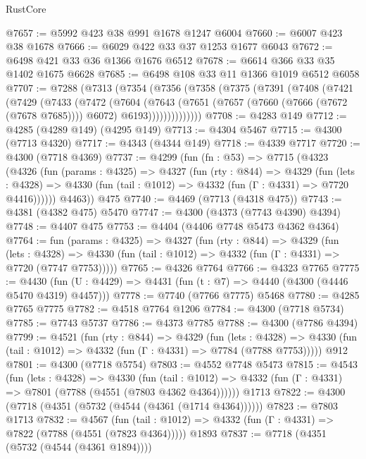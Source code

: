 \begin{lexlean}{RustCore}
\begin{coremodule}
@7657 := @5992 @423 @38 @991 @1678 @1247 @6004
@7660 := @6007 @423 @38 @1678
@7666 := @6029 @422 @33 @37 @1253 @1677 @6043
@7672 := @6498 @421 @33 @36 @1366 @1676 @6512
@7678 := @6614 @366 @33 @35 @1402 @1675 @6628
@7685 := @6498 @108 @33 @11 @1366 @1019 @6512 @6058
@7707 := @7288
    (@7313
      (@7354
        (@7356
          (@7358
            (@7375
              (@7391
                (@7408
                  (@7421
                    (@7429
                      (@7433
                        (@7472
                          (@7604
                            (@7643
                              (@7651
                                (@7657 (@7660 (@7666 (@7672 (@7678 @7685)))) @6072)
                                @6193))))))))))))))
@7708 := @4283 @149
@7712 := @4285 (@4289 @149) (@4295 @149)
@7713 := @4304 @5467
@7715 := @4300 (@7713 @4320)
@7717 := @4343 (@4344 @149)
@7718 := @4339 @7717
@7720 := @4300 (@7718 @4369)
@7737 := @4299
    (fun (fn : @53) =>
    @7715
      (@4323
        (@4326
          (fun (params : @4325) =>
          @4327
            (fun (rty : @844) =>
            @4329
              (fun (lets : @4328) =>
              @4330 (fun (tail : @1012) => @4332 (fun (Γ : @4331) => @7720 @4416))))))
        @4463))
    @475
@7740 := @4469 (@7713 (@4318 @475))
@7743 := @4381 (@4382 @475) @5470
@7747 := @4300 (@4373 (@7743 @4390) @4394)
@7748 := @4407 @475
@7753 := @4404 (@4406 @7748 @5473 @4362 @4364)
@7764 := fun (params : @4325) =>
  @4327
    (fun (rty : @844) =>
    @4329
      (fun (lets : @4328) =>
      @4330 (fun (tail : @1012) => @4332 (fun (Γ : @4331) => @7720 (@7747 @7753)))))
@7765 := @4326 @7764
@7766 := @4323 @7765
@7775 := @4430 (fun (U : @4429) => @4431 (fun (t : @7) => @4440 (@4300 (@4446 @5470 @4319) @4457)))
@7778 := @7740 (@7766 @7775) @5468
@7780 := @4285 @7765 @7775
@7782 := @4518 @7764 @1206
@7784 := @4300 (@7718 @5734)
@7785 := @7743 @5737
@7786 := @4373 @7785
@7788 := @4300 (@7786 @4394)
@7799 := @4521
    (fun (rty : @844) =>
    @4329
      (fun (lets : @4328) =>
      @4330 (fun (tail : @1012) => @4332 (fun (Γ : @4331) => @7784 (@7788 @7753)))))
    @912
@7801 := @4300 (@7718 @5754)
@7803 := @4552 @7748 @5473
@7815 := @4543
    (fun (lets : @4328) =>
    @4330
      (fun (tail : @1012) => @4332 (fun (Γ : @4331) => @7801 (@7788 (@4551 (@7803 @4362 @4364))))))
    @1713
@7822 := @4300 (@7718 (@4351 (@5732 (@4544 (@4361 (@1714 @4364))))))
@7823 := @7803 @1713
@7832 := @4567
    (fun (tail : @1012) => @4332 (fun (Γ : @4331) => @7822 (@7788 (@4551 (@7823 @4364)))))
    @1893
@7837 := @7718 (@4351 (@5732 (@4544 (@4361 @1894))))

\end{coremodule}
\end{lexlean}
